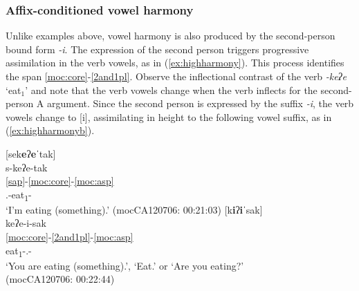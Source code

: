\documentclass[output=paper]{langscibook}
\begin{document}

\subsubsection{Affix-conditioned vowel harmony}
Unlike examples above, vowel harmony is also produced by the second-person bound form \textit{-i}. The expression of the second person triggers progressive assimilation in the verb vowels, as in (\ref{ex:highharmony}). This process identifies the span \ref{moc:core}-\ref{2and1pl}. Observe the inflectional contrast of the verb \textit{-keʔe} `eat$_1$' and note that the verb vowels change when the verb inflects for the second-person A argument. Since the second person is expressed by the suffix \textit{-i}, the verb vowels change to [i], assimilating in height to the following vowel suffix, as in (\ref{ex:highharmonyb}). 

\ea \label{ex:highharmony}
\ea \label{ex:highharmonya}
 [sek\textbf{e}ʔ\textbf{e}ˈtak]\\
\glll s-keʔe-tak\\
\ref{sap}-\ref{moc:core}-\ref{moc:asp}\\
{\First.\II}-eat\textsubscript{1}-{\Prog}\\
\glt `I'm eating (something).' \hfill(mocCA120706: 00:21:03)
\ex \label{ex:highharmonyb}
 [k\textbf{i}ʔ\textbf{i}ˈsak]\\
\glll keʔe-i-sak\\
\ref{moc:core}-\ref{2and1pl}-\ref{moc:asp} \\
eat\textsubscript{1}-{\Second.\II}-{\Prog}\\
\glt `You are eating (something).', `Eat.' or `Are you eating?'\\\hfill (mocCA120706: 00:22:44)
\z
\z 
\end{document}
